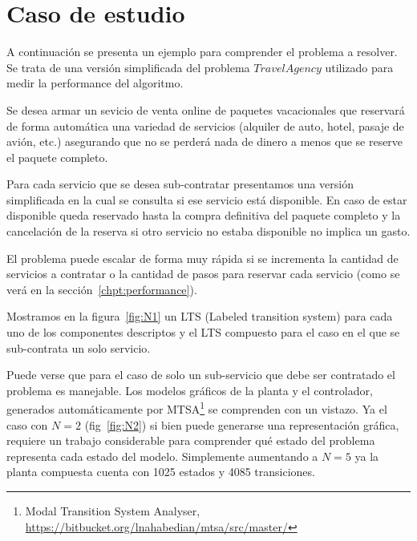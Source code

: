 
\section{Caso de estudio}\label{chpt:casoAviones}
A continuación se presenta un ejemplo para comprender el problema a resolver. Se trata de una versión simplificada del problema $Travel Agency$ utilizado para medir la performance del algoritmo.

Se desea armar un sevicio de venta online de paquetes vacacionales que reservará de forma automática una variedad de servicios (alquiler de auto, hotel, pasaje de avión, etc.) asegurando que no se perderá nada de dinero a menos que se reserve el paquete completo.

Para cada servicio que se desea sub-contratar presentamos una versión simplificada en la cual se consulta si ese servicio está disponible. En caso de estar disponible queda reservado hasta la compra definitiva del paquete completo y la cancelación de la reserva si otro servicio no estaba disponible no implica un gasto.

El problema puede escalar de forma muy rápida si se incrementa la cantidad de servicios a contratar o la cantidad de pasos para reservar cada servicio (como se verá en la sección~\ref{chpt:performance}).

Mostramos en la figura~\ref{fig:N1} un LTS (Labeled transition system) para cada uno de los componentes descriptos y el LTS compuesto para el caso en el que se sub-contrata un solo servicio.

Puede verse que para el caso de solo un sub-servicio que debe ser contratado el problema es manejable. Los modelos gráficos de la planta y el controlador, generados automáticamente por MTSA\footnote{Modal Transition System Analyser, \href{https://bitbucket.org/lnahabedian/mtsa/src/master/^}{https://bitbucket.org/lnahabedian/mtsa/src/master/}} se comprenden con un vistazo. Ya el caso con $N=2$ (fig~\ref{fig:N2}) si bien puede generarse una representación gráfica, requiere un trabajo considerable para comprender qué estado del problema representa cada estado del modelo. Simplemente aumentando a $N=5$ ya la planta compuesta cuenta con 1025 estados y 4085 transiciones. 

